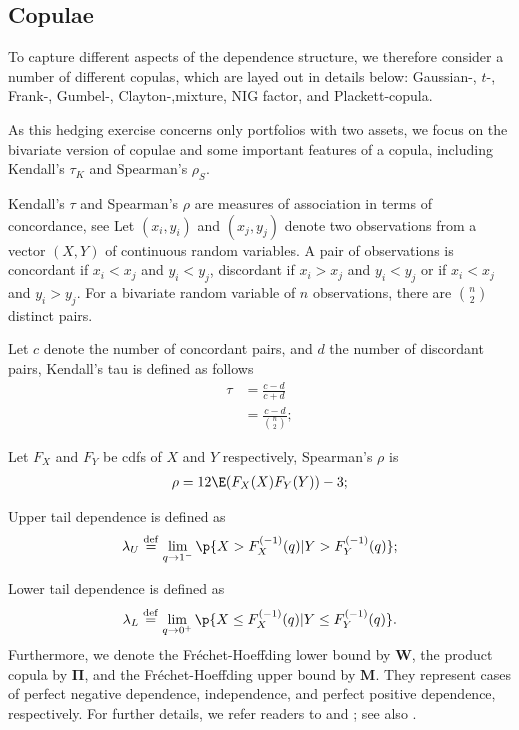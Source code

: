 
\subsection{Copulae}\label{subsec:copulae}
To capture different aspects of the dependence structure, we
  therefore consider a number of different copulas, which are layed
  out in details below: \medskip
Gaussian-, $t$-, Frank-,
Gumbel-, Clayton-,mixture, NIG factor, and Plackett-copula. \medskip

As this hedging exercise concerns only portfolios with two assets, we
focus on the bivariate version of copulae and some important
features of a copula, including Kendall's $\tau_K$ and Spearman's $\rho_S$. \medskip

Kendall's $\tau$ and Spearman's $\rho$ are measures of association in terms of concordance, see \cite{kruskal1958ordinal}
Let $(x_i, y_i)$ and $(x_j, y_j)$ denote two observations from a vector $(X, Y)$ of continuous random variables.
A pair of observations is concordant if $x_i<x_j$ and $y_i < y_j$, discordant if
$x_i>x_j$ and $y_i < y_j$ or if $x_i<x_j$ and $y_i>y_j$.
For a bivariate random variable of $n$ observations, there are $\binom{n}{2}$ distinct pairs. \medskip

Let $c$ denote the number of concordant pairs, and $d$ the number of discordant pairs,
Kendall's tau is defined as follows \citep{Nelsen1999}
\begin{align*}
\tau &= \frac{c-d}{c+d} \\[10pt]
     &= \frac{c-d}{\binom{n}{2}};
\end{align*}

Let $F_X$ and $F_Y$ be cdfs of $X$ and $Y$ respectively, Spearman's $\rho$ is
\begin{align*}
\rho = 12\E (F_X(X)F_Y(Y))-3;
\end{align*}

Upper tail dependence is defined as
\begin{equation*}
\lambda_U \overset{\mathrm{def}}{=}  \lim_{q
  \rightarrow 1^-} \p\{X > F_{X}^{(-1)}(q)|Y > F_{Y}^{(-1)}(q)\};
\end{equation*}

Lower tail dependence is defined as
\begin{equation*}
\lambda_L \overset{\mathrm{def}}{=}  \lim_{q
  \rightarrow 0^+} \p\{X \leq F_{X}^{(-1)}(q)|Y \leq
F_{Y}^{(-1)}(q)\}. 
\end{equation*}
Furthermore, we denote the Fr{\'e}chet-Hoeffding lower bound by
$\bm{W}$, the product copula by $\bm{\Pi}$, and the Fr{\'e}chet-Hoeffding
upper bound by $\bm{M}$. They represent cases of perfect negative
dependence, independence, and perfect positive dependence,
respectively. 
For further details, we refer readers to \citet{joe1997multivariate}
and \citet{Nelsen1999}; see also \citet{hardle2010copulis}.

